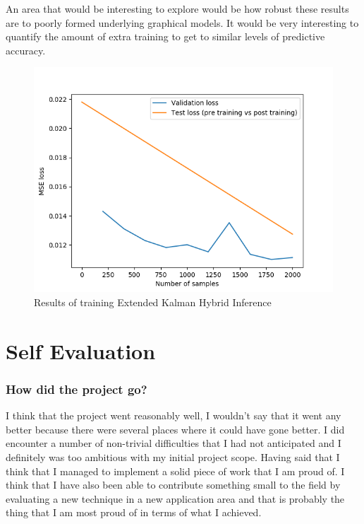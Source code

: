 \documentclass[]{../resources/final_report}
\begin{document}
An area that would be interesting to explore would be how robust these results are to poorly formed underlying graphical models. It would be very interesting to quantify the amount of extra training to get to similar levels of predictive accuracy.

\begin{figure}[h!]
  \centering
  \includegraphics[height=0.4\textheight]{training2000.png}  
  \caption{Results of training Extended Kalman Hybrid Inference}
  \label{}
\end{figure}
\pagebreak

\section{Self Evaluation}

\subsubsection{How did the project go?}

I think that the project went reasonably well, I wouldn't say that it went any better because there were several places where it could have gone better. I did encounter a number of non-trivial difficulties that I had not anticipated and I definitely was too ambitious with my initial project scope. Having said that I think that I managed to implement a solid piece of work that I am proud of. I think that I have also been able to contribute something small to the field by evaluating a new technique in a new application area and that is probably the thing that I am most proud of in terms of what I achieved.
\end{document}
